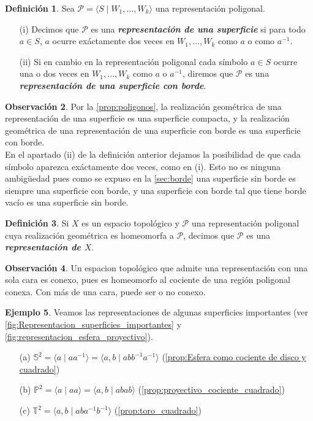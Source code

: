 \documentclass[10pt]{report}
\newcommand{\Toro}{\mathbb{T}^2}
\newcommand{\enfatiza}[1]{\textbf{\textit{#1}}}
\theoremstyle{definition}
\newtheorem{defin}{Definición}[section]
\newtheorem{obs}[defin]{Observación}
\newtheorem{eje}[defin]{Ejemplo}
\begin{document}
\begin{defin}%
Sea $\mathcal{P} =\langle S\mid W_1,\dots ,W_k\rangle$ una representación poligonal. 
\begin{itemize}
\item[(i)] Decimos que $\mathcal{P}$ es una \enfatiza{representación de una superficie} si para todo $a\in S$, $a$ ocurre exáctamente dos veces en $W_1,...,W_k$ como $a$ o como $a^{-1}$.
\item[(ii)] Si en cambio en la representación poligonal cada símbolo $a\in S$ ocurre una o dos veces en $W_1,\dots ,W_k$ como $a$ o $a^{-1}$, diremos que $\mathcal{P}$ es una \enfatiza{representación de una superficie con borde}. 
\end{itemize}
\end{defin}
\begin{obs}%
Por la \autoref{prop:poligonos}, la realización geométrica de una representación de una superficie es una superficie compacta, y la realización geométrica de una representación de una superficie con borde es una superficie con borde.\\
En el apartado (ii) de la definición anterior dejamos la posibilidad de que cada símbolo aparezca exáctamente dos veces, como en (i). Esto no es ninguna ambigüedad pues como se expuso en la \autoref{sec:borde} una superficie sin borde es siempre una superficie con borde, y una superficie con borde tal que tiene borde vacío es una superficie sin borde.
\end{obs}
\begin{defin}%
Si $X$ es un espacio topológico y $\mathcal{P}$ una representación poligonal cuya realización geométrica es homeomorfa a $\mathcal{P}$, decimos que $\mathcal{P}$ es una \textbf{\emph{representación de $X$}}.
\end{defin}
\begin{obs}%
Un espacion topológico que admite una representación con una sola cara es conexo, pues es homeomorfo al cociente de una región poligonal conexa. Con más de una cara, puede ser o no conexo.
\end{obs}
\begin{eje}\label{eje:rep_sup_importantes}%
Veamos las representaciones de algunas superficies importantes (ver \autoref{fig:Representacion_superficies_importantes} y \autoref{fig:representacion_esfera_proyectivo}).
\begin{itemize}
\item[(a)] $\mathbb{S}^2=\langle a\mid aa^{-1}\rangle=\langle a,b\mid  abb^{-1}a^{-1}\rangle$ (\autoref{prop:Esfera como cociente de disco y cuadrado})
\item[(b)] $\mathbb{P}^2= \langle a\mid aa \rangle = \langle a,b\mid abab \rangle$ (\autoref{prop:proyectivo_cociente_cuadrado})
\item[(c)] $\Toro=\langle a,b\mid aba^{-1}b^{-1}\rangle$ (\autoref{prop:toro_cuadrado})
\end{itemize}
\end{eje}
\end{document}
